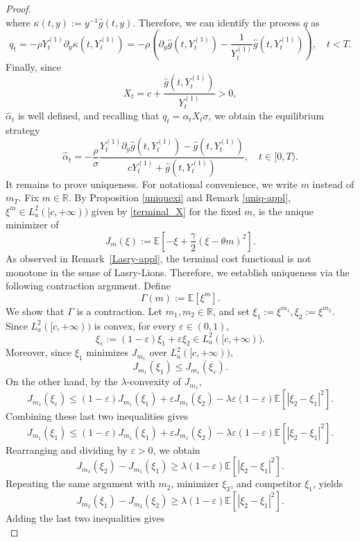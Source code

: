 \documentclass[10pt,a4paper]{amsart}
\begin{document}
\begin{proof}
\[\]
where $\kappa (t,y) :=y^{-1}\hat g(t,y)$. Therefore, we can identify the process $q$ as
\[
q_t=-\rho Y_t^{(1)} \partial_y \kappa (t,Y^{(1)}_t)=-\rho
\left(
\partial_{y}\hat g(t,Y^{(1)}_t) - \frac{1}{Y^{(1)}_t} \hat g(t,Y^{(1)}_t)\right),\quad   t<T.
\]
Finally, since
\[
X_t=c+\frac{\hat g(t,Y_t^{(1)})}{Y_t^{(1)}}>0,
\]
\(\hat\alpha_t\) is well defined, and recalling that
\(q_t=\alpha_tX_t\sigma\), we obtain the equilibrium strategy
\begin{equation}
\label{opt-alpha}
\hat \alpha_t= -\frac{\rho}{\sigma}
\dfrac{Y^{(1)}_t\partial_{y}\hat g(t,Y^{(1)}_t) - \hat g(t,Y^{(1)}_t)}{cY^{(1)}_t+\hat g(t,Y^{(1)}_t)}, \quad t\in [0,T).
\end{equation}
It remains to prove uniqueness. For notational convenience, we write $m$ instead of $m_T$.	
Fix $m\in \mathbb R$. By Proposition \ref{uniquexi} and Remark \ref{uniq-appl}, $\xi^m\in L^2_a([c, +\infty))$ given by \eqref{terminal_X} for the fixed $m$, is  the unique minimizer of 
\[
J_m(\xi) := \mathbb E\left[-\xi+\frac{\gamma}{2}(\xi-\theta m)^2\right]. 
\]
As observed in  Remark~\ref{Lasry-appl}, the terminal cost functional is not monotone in the sense of Lasry-Lions. Therefore, we establish uniqueness via the following contraction argument.
Define
\[
\Gamma(m):=\mathbb E[\xi^m].
\]
We show that \(\Gamma\) is a contraction.
Let \(m_1,m_2\in\mathbb R\), and set
$\xi_1:=\xi^{m_1}, \xi_2:=\xi^{m_2}$.
Since \(L^2_a([c, +\infty))\) is convex, for every \(\varepsilon\in(0,1)\),
\[
\xi_\varepsilon:=(1-\varepsilon)\xi_1+\varepsilon\xi_2\in L^2_a([c, +\infty)).
\]
Moreover, since \(\xi_1\) minimizes \(J_{m_1}\) over \(L^2_a([c, +\infty))\),
\[
J_{m_1}(\xi_1)\le J_{m_1}(\xi_\varepsilon).
\]
On the other hand, by the \(\lambda\)-convexity of \(J_{m_1}\),
\[
J_{m_1}(\xi_\varepsilon)\le(1-\varepsilon)J_{m_1}(\xi_1)+\varepsilon J_{m_1}(\xi_2)-\lambda\varepsilon(1-\varepsilon)\mathbb E\left[|\xi_2-\xi_1|^2 \right].
\]
Combining these last two inequalities gives
\[
J_{m_1}(\xi_1)\le(1-\varepsilon)J_{m_1}(\xi_1)+\varepsilon J_{m_1}(\xi_2)-\lambda\varepsilon(1-\varepsilon)\mathbb E\left[|\xi_2-\xi_1|^2 \right].
\]
Rearranging and dividing by \(\varepsilon>0\), we obtain
\[
J_{m_1}(\xi_2)-J_{m_1}(\xi_1)\ge \lambda(1-\varepsilon)\mathbb E\left[|\xi_2-\xi_1|^2 \right].
\]
Repeating the same argument with \(m_2\), minimizer \(\xi_2\), and competitor \(\xi_1\), yields
\[
J_{m_2}(\xi_1)-J_{m_2}(\xi_2)\ge\lambda (1-\varepsilon)\mathbb E\left[|\xi_2-\xi_1|^2 \right].
\]
Adding the last two inequalities gives
\begin{equation}\label{ineq-m1m2}

\end{equation}
\end{proof}
\end{document}
